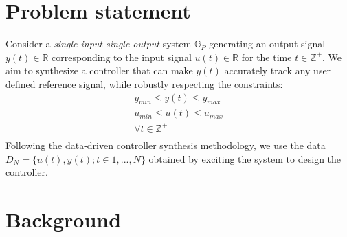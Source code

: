 \documentclass[letterpaper, 10 pt, conference]{ieeeconf}  %
\begin{document}
\section{Problem statement}
\label{Problem statement}
Consider a \textit{single-input single-output} system $\mathbb{G}_P$ generating an output signal $y(t) \in \mathbb{R}$ corresponding to the input signal $u(t) \in \mathbb{R}$ for the time $t \in \mathbb{Z}^+$. We aim to synthesize a controller that can make $y(t)$ accurately track any user defined reference signal, while robustly respecting the constraints:
\begin{equation*} 
\begin{matrix}
y_{min}\leq y(t) \leq y_{max}\\
u_{min}\leq u(t) \leq u_{max} \\
\forall t \in \mathbb{Z}^+\\
\end{matrix}
\end{equation*} 
Following the data-driven controller synthesis methodology, we use the data $D_{N}=\{u(t),y(t);t\in{1,...,N}\}$ obtained by exciting the system to design the controller.
\section{Background}
\label{Background}
\end{document}

